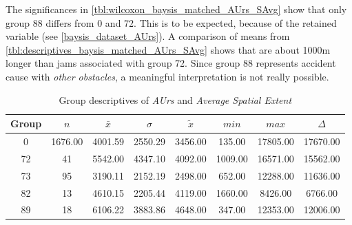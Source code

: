 The significances in \autoref{tbl:wilcoxon_baysis_matched_AUrs_SAvg} show that only group 88 differs from 0 and 72. This is to be expected, because of the retained variable (see \autoref{baysis_dataset_AUrs}). A comparison of means from \autoref{tbl:descriptives_baysis_matched_AUrs_SAvg} shows that are about 1000m longer than jams associated with group 72. Since group 88 represents accident cause with \textit{other obstacles}, a meaningful interpretation is not really possible. 
\begin{table}[ht]
	\small
	\centering
	\begin{tabular}{c|c|c|c|c|c|c|c}
		\toprule
		Group & $n$ & $\bar{x}$ & $\sigma$ & $\tilde{x}$ & $min$ & $max$ & $\Delta$ \\ 
		\midrule
		0  & 1676.00 & 4001.59 & 2550.29 & 3456.00 & 135.00 & 17805.00 & 17670.00 \\ 
		72 & 41 & 5542.00 & 4347.10 & 4092.00 & 1009.00 & 16571.00 & 15562.00 \\ 
		73 & 95 & 3190.11 & 2152.19 & 2498.00 & 652.00 & 12288.00 & 11636.00 \\ 
		82 & 13 & 4610.15 & 2205.44 & 4119.00 & 1660.00 & 8426.00 & 6766.00 \\ 
		89 & 18 & 6106.22 & 3883.86 & 4648.00 & 347.00 & 12353.00 & 12006.00 \\ 
		\bottomrule
	\end{tabular}
	\caption{Group descriptives of \textit{AUrs} and \textit{Average Spatial Extent}}
	\label{tbl:descriptives_baysis_matched_AUrs_SAvg}
\end{table}

